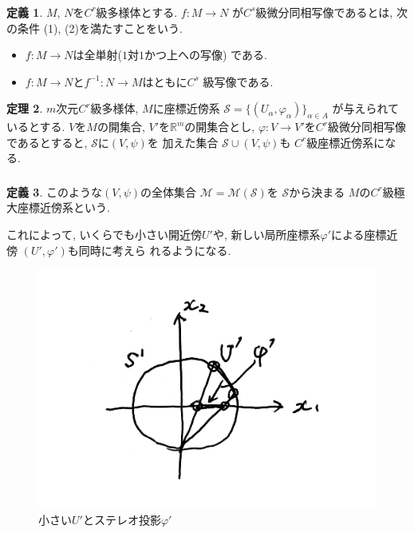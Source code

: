 \documentclass[dvipdfmx,cjk]{beamer}
\theoremstyle{definition}
\newtheorem{dfn}{\textbf{ 定義 }}
\newtheorem{thm}[dfn]{\textbf{ 定理 }}
\begin{document}
\begin{frame}
  \frametitle{}
  \begin{dfn}\label{def:C^s deffeomorphism}
    $M$, $N$を$C^r$級多様体とする. $f:M\to N$
    が$C^s$級微分同相写像であるとは, 次の条件
    (1), (2)を満たすことをいう. 
    \begin{itemize}
        \item[(1)]
        $f:M\to N$は全単射($1$対$1$かつ上への写像)
        である. 
        \item[(2)] 
        $f:M\to N$と$f^{-1}:N\to M$はともに$C^s$
        級写像である. 
    \end{itemize}
\end{dfn}
\begin{thm}
  $m$次元$C^r$級多様体, $M$に座標近傍系
  $\mathcal{S}=
   \{(U_\alpha, \varphi_\alpha)\}_{\alpha\in A}$
   が与えられているとする. 
   $V$を$M$の開集合, 
   $V'$を$\mathbb{R}^m$の開集合とし,  
   $\varphi:V\to V'$を$C^r$級微分同相写像
   であるとすると, $\mathcal{S}$に$(V,\psi)$を
   加えた集合
   $\mathcal{S}\cup (V,\psi)$も
   $C^r$級座標近傍系になる. 
   \end{thm}
\end{frame}
\begin{frame}
  \frametitle{}
  \begin{dfn}
  このような$(V,\psi)$の全体集合
  $\mathcal{M}=\mathcal{M}(\mathcal{S})$を
  $\mathcal{S}$から決まる
  $M$の$C^r$級極大座標近傍系という.
  \end{dfn}
  これによって, いくらでも小さい開近傍$U'$や, 
  新しい局所座標系$\varphi '$による座標近傍
  $(U',\varphi ')$も同時に考えら
  れるようになる. 
  \begin{figure}[H]
    \centering
    \includegraphics[keepaspectratio, scale=0.25]{stereoprojection.pdf}
    \caption{小さい$U'$とステレオ投影$\varphi '$}
    \label{}
\end{figure}
\end{frame}
\end{document}
